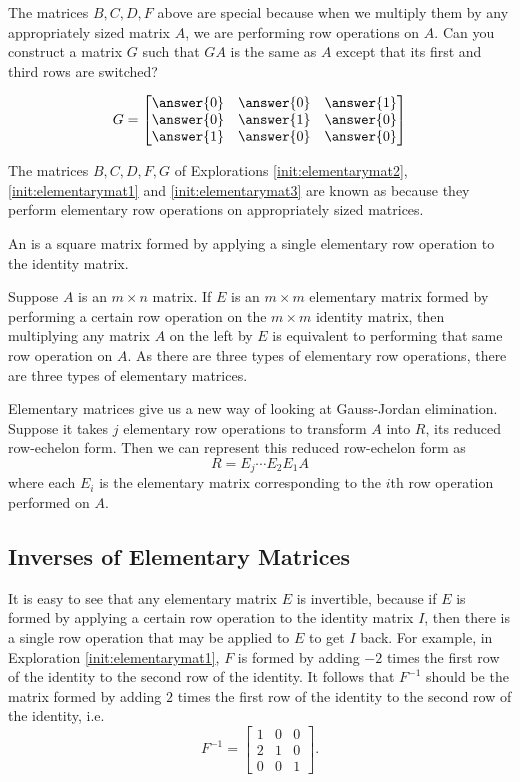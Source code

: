 \documentclass{ximera}
\begin{document}
 
\begin{exploration}\label{init:elementarymat3}
 The matrices $B,C,D,F$ above are special because when we multiply them by any appropriately sized matrix $A$, we are performing row operations on $A$.  Can you construct a matrix $G$ such that $GA$ is the same as $A$ except that its first and third rows are switched?
 
 $$G=\begin{bmatrix}\answer{0} & \answer{0} & \answer{1} \\ \answer{0} & \answer{1} & \answer{0}\\ \answer{1} & \answer{0} & \answer{0}\end{bmatrix}$$

\end{exploration}


The matrices $B,C,D, F, G$ of Explorations \ref{init:elementarymat2}, \ref{init:elementarymat1} and \ref{init:elementarymat3} are known as  because they perform elementary row operations on appropriately sized matrices.

\begin{definition} \label{def:elemmatrix}
  An  is a square matrix formed by applying a single elementary row operation to the identity matrix.
  \end{definition}

Suppose $A$ is an $m \times n$ matrix.  If $E$ is an $m \times m$ elementary matrix formed by performing a certain row operation on the $m \times m$ identity matrix, then multiplying any matrix $A$ on the left by $E$ is equivalent to performing that same row operation on $A$.  As there are three types of elementary row operations, there are three types of elementary matrices.

Elementary matrices give us a new way of looking at Gauss-Jordan elimination.  Suppose it takes $j$ elementary row operations to transform $A$ into $R$, its reduced row-echelon form.  Then we can represent this reduced row-echelon form as
$$R = E_j \cdots E_2 E_1 A$$
where each $E_i$ is the elementary matrix corresponding to the $i$th row operation performed on $A$.  

\subsection*{Inverses of Elementary Matrices}

It is easy to see that any elementary matrix $E$ is invertible, because if $E$ is formed by applying a certain row operation to the identity matrix $I$, then there is a single row operation that may be applied to $E$ to get $I$ back.  For example, in Exploration \ref{init:elementarymat1}, $F$ is formed by adding $-2$ times the first row of the identity to the second row of the identity.  It follows that $F^{-1}$ should be the matrix formed by adding $2$ times the first row of the identity to the second row of the identity, i.e.
 $$F^{-1} =  \begin{bmatrix}  
 1&0&0\\2&1&0\\0&0&1
 \end{bmatrix}.
$$
\end{document}
